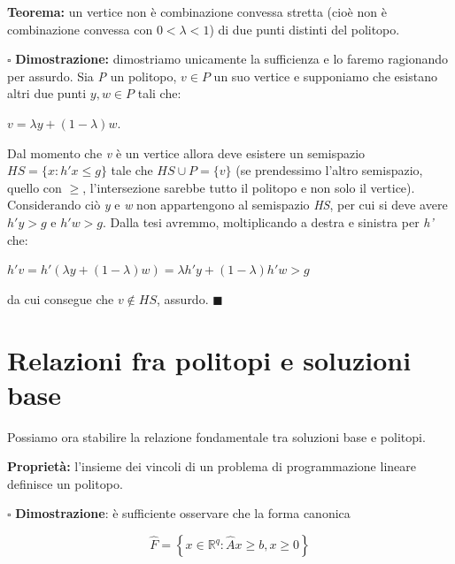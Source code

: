 \documentclass[11pt]{book}
\begin{document}
{\bf Teorema:} un vertice non \`e combinazione convessa stretta
(cio\`e non \`e combinazione convessa con $0 < \lambda<1$) di due
punti distinti del politopo.
\newline

\vspace{11pt} $\square$ {\bf Dimostrazione:} dimostriamo unicamente la
sufficienza e lo faremo ragionando per assurdo. Sia {\em P} un
politopo, $v \in P$ un suo vertice e supponiamo che esistano altri due
punti $y, w \in P$ tali che:

\begin{center}
$v = \lambda y + (1 - \lambda)w$.
\end{center}

Dal momento che {\em v} \`e un vertice allora deve esistere un
semispazio $HS = \{ x : h'x \leq g\}$ tale che $HS \cup P = \{ v \}$
(se prendessimo l'altro semispazio, quello con $\geq$, l'intersezione
sarebbe tutto il politopo e non solo il vertice). Considerando ci\`o
{\em y} e {\em w} non appartengono al semispazio {\em HS}, per cui si
deve avere $h'y > g$ e $h'w > g$. Dalla tesi avremmo, moltiplicando a
destra e sinistra per {\em h'} che:

\begin{center}
$h'v = h'(\lambda y + (1-\lambda)w) = \lambda h'y + (1-\lambda)h'w >
  g$
\end{center}
da cui consegue che $v \not\in HS$, assurdo.
$\blacksquare$
\newline\vspace{11pt}



\section{Relazioni fra politopi e soluzioni base}

Possiamo ora stabilire la relazione fondamentale tra soluzioni base e
politopi.

{\bf Propriet\`a:} l'insieme dei vincoli di un problema di programmazione lineare
definisce un politopo.

\par\bigskip 
$\square$ {\bf Dimostrazione}: \`e sufficiente osservare che la forma canonica

$$\hat F = \left\{x \in \mathbb{R}^q : \hat A x \geq b, x \geq 0
\right\}$$
\end{document}
